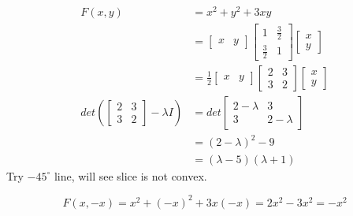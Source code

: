 \begin{example}
	\begin{align*}
	F(x,y) &= x^2 + y^2 + 3xy \\
	&= \begin{bmatrix}
	x&y
	\end{bmatrix}\begin{bmatrix}
	1&\frac{3}{2}\\
	\frac{3}{2} & 1
	\end{bmatrix}\begin{bmatrix}
	x\\
	y
	\end{bmatrix}\\
	&=\frac{1}{2}\begin{bmatrix}
	x&y
	\end{bmatrix}\begin{bmatrix}
	2&3\\
	3 & 2
	\end{bmatrix}\begin{bmatrix}
	x\\
	y
	\end{bmatrix}\\
	det(\begin{bmatrix}
	2&3\\
	3&2
	\end{bmatrix} - \lambda I) &= det\begin{bmatrix}
	2-\lambda & 3\\
	3 & 2-\lambda
	\end{bmatrix}\\
	&= (2-\lambda)^2 - 9\\
	&= (\lambda - 5)(\lambda + 1)
	\end{align*}
	Try $-45^{\circ}$ line, will see slice is not convex.
	
	\begin{equation*}
	F(x,-x) = x^2 + (-x)^2 + 3x(-x) = 2x^2 - 3x^2 = -x^2
	\end{equation*}
	
\end{example}

